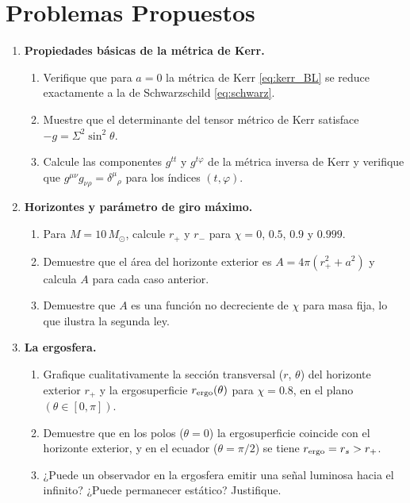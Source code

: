 \section{Problemas Propuestos}
\label{sec:problemas_cap8}

\begin{enumerate}[leftmargin=2em, label=\textbf{P\thechapter.\arabic*.}]

  \item \textbf{Propiedades básicas de la métrica de Kerr.}
  \begin{enumerate}[label=(\alph*)]
    \item Verifique que para $a = 0$ la métrica de Kerr \eqref{eq:kerr_BL} se reduce exactamente a la de Schwarzschild \eqref{eq:schwarz}.
    \item Muestre que el determinante del tensor métrico de Kerr satisface $-g = \Sigma^2\sin^2\!\theta$.
    \item Calcule las componentes $g^{tt}$ y $g^{t\varphi}$ de la métrica inversa de Kerr y verifique que $g^{\mu\nu}g_{\nu\rho} = \delta^\mu{}_\rho$ para los índices $(t,\varphi)$.
  \end{enumerate}

  \item \textbf{Horizontes y parámetro de giro máximo.}
  \begin{enumerate}[label=(\alph*)]
    \item Para $M = 10\,M_\odot$, calcule $r_+$ y $r_-$ para $\chi = 0$, $0.5$, $0.9$ y $0.999$.
    \item Demuestre que el área del horizonte exterior es $A = 4\pi(r_+^2 + a^2)$ y calcula $A$ para cada caso anterior.
    \item Demuestre que $A$ es una función no decreciente de $\chi$ para masa fija, lo que ilustra la segunda ley.
  \end{enumerate}

  \item \textbf{La ergosfera.}
  \begin{enumerate}[label=(\alph*)]
    \item Grafique cualitativamente la sección transversal ($r$, $\theta$) del horizonte exterior $r_+$ y la ergosuperficie $r_{\rm ergo}(\theta)$ para $\chi = 0.8$, en el plano $(\theta \in [0,\pi])$.
    \item Demuestre que en los polos ($\theta = 0$) la ergosuperficie coincide con el horizonte exterior, y en el ecuador ($\theta = \pi/2$) se tiene $r_{\rm ergo} = r_s > r_+$.
    \item ¿Puede un observador en la ergosfera emitir una señal luminosa hacia el infinito? ¿Puede permanecer estático? Justifique.
  \end{enumerate}


\end{enumerate}
